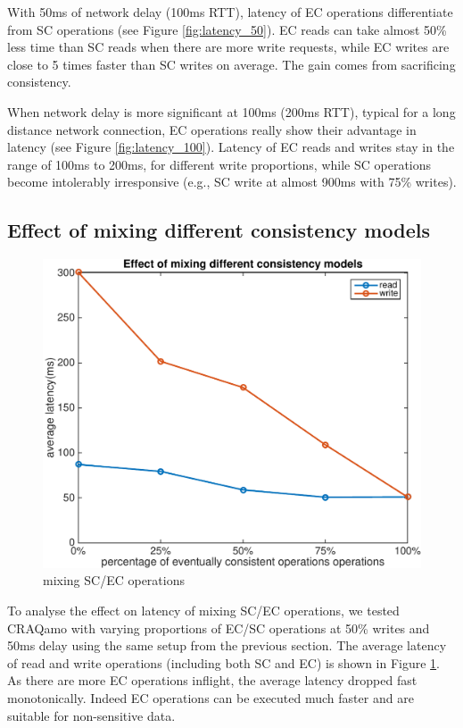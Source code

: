 With 50ms of network delay (100ms RTT), latency of EC operations differentiate from SC operations  (see Figure \ref{fig:latency_50}). EC reads can take almost 50\% less time than SC reads when there are more write requests, while EC writes are close to 5 times faster than SC writes on average. The gain comes from sacrificing consistency.

When network delay is more significant at 100ms (200ms RTT), typical for a long distance network connection, EC operations really show their advantage in latency  (see Figure \ref{fig:latency_100}). Latency of EC reads and writes stay in the range of 100ms to 200ms, for different write proportions, while SC operations become intolerably irresponsive (e.g., SC write at almost 900ms with 75\% writes).

\subsection{Effect of mixing different consistency models}
\vspace{-2mm}
\begin{figure}[h]
\centering
\includegraphics[width=\linewidth]{figures/mix.pdf}
\caption{mixing SC/EC operations}
\label{fig:mix}
\end{figure}
\vspace{-5mm}

To analyse the effect on latency of mixing SC/EC operations, we tested CRAQamo with varying proportions of EC/SC operations at 50\% writes and 50ms delay using the same setup from the previous section. The average latency of read and write operations (including both SC and EC) is shown in Figure \ref{fig:mix}.  As there are more EC operations inflight, the average latency dropped fast monotonically. Indeed EC operations can be executed much faster and are suitable for non-sensitive data.


